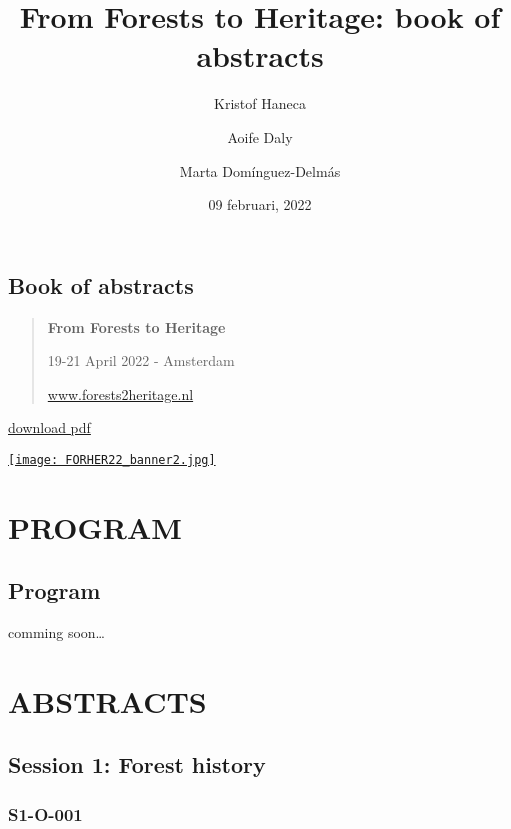 \documentclass[
]{book}
\title{From Forests to Heritage: book of abstracts}
\author{Kristof Haneca \and Aoife Daly \and Marta Domínguez-Delmás}
\date{09 februari, 2022}
\begin{document}
\maketitle

{
\setcounter{tocdepth}{1}
\tableofcontents
}
\hypertarget{book-of-abstracts}{%
\chapter*{Book of abstracts}\label{book-of-abstracts}}

\begin{quote}
\textbf{From Forests to Heritage}

19-21 April 2022 - Amsterdam

\href{https://event.forests2heritage.nl/}{www.forests2heritage.nl}
\end{quote}

\href{./docs/forests2heritage.pdf}{download pdf}

\href{https://event.forests2heritage.nl/}{\texttt{[image: FORHER22\_banner2.jpg]}}

\hypertarget{part-program}{%
\part*{PROGRAM}\label{part-program}}

\hypertarget{program}{%
\chapter*{Program}\label{program}}

comming soon\ldots{}

\hypertarget{part-abstracts}{%
\part*{ABSTRACTS}\label{part-abstracts}}

\hypertarget{session-1-forest-history}{%
\chapter*{Session 1: Forest history}\label{session-1-forest-history}}

\hypertarget{s1-o-001}{%
\section*{S1-O-001}\label{s1-o-001}}
\end{document}
